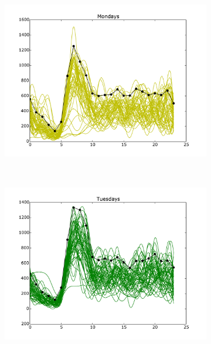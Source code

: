 \documentclass[10pt,a4paper]{amsart}
\begin{document}
\begin{figure}
    \begin{subfigure}[b]{0.6\textwidth}
        \includegraphics[width=\textwidth]
        		{Figures/Daily_trends_AC_Monday.pdf}
    \end{subfigure}
    ~
    \begin{subfigure}[b]{0.6\textwidth}
        \includegraphics[width=\textwidth]
        		{Figures/Daily_trends_AC_Tuesday.pdf}
    \end{subfigure}


\end{figure}
\end{document}
